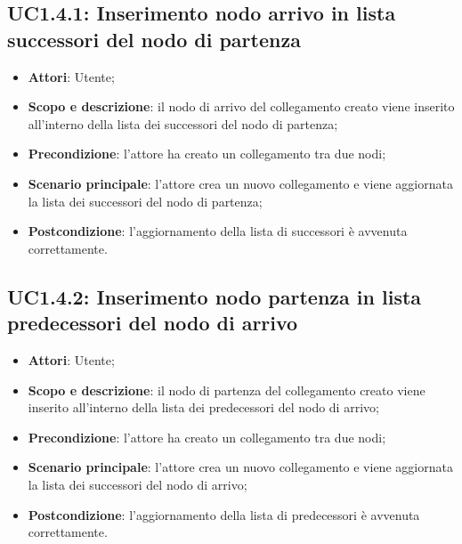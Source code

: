 \subsection{UC1.4.1: Inserimento nodo arrivo in lista successori del nodo di partenza} 
\hypertarget{UC1.4.1}{} 
\begin{itemize} 
	\item{\textbf{Attori}: Utente;} 
	\item{\textbf{Scopo e descrizione}: il nodo di arrivo del collegamento creato viene inserito all'interno della lista dei successori del nodo di partenza;}  
	\item{\textbf{Precondizione}: l'attore ha creato un collegamento tra due nodi;} 
	\item{\textbf{Scenario principale}: l'attore crea un nuovo collegamento e viene aggiornata la lista dei successori del nodo di partenza;}
	\item{\textbf{Postcondizione}: l'aggiornamento della lista di successori è avvenuta correttamente.} 
\end{itemize} 
\subsection{UC1.4.2: Inserimento nodo partenza in lista predecessori del nodo di arrivo} 
\hypertarget{UC1.4.2}{} 
\begin{itemize} 
	\item{\textbf{Attori}: Utente;} 
	\item{\textbf{Scopo e descrizione}: il nodo di partenza del collegamento creato viene inserito all'interno della lista dei predecessori del nodo di arrivo;} 
	\item{\textbf{Precondizione}: l'attore ha creato un collegamento tra due nodi;} 
	\item{\textbf{Scenario principale}: l'attore crea un nuovo collegamento e viene aggiornata la lista dei successori del nodo di arrivo;}
	\item{\textbf{Postcondizione}: l'aggiornamento della lista di predecessori è avvenuta correttamente.} 
\end{itemize} 
